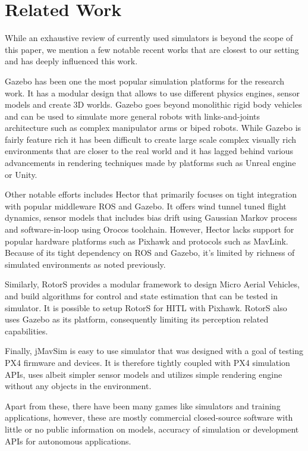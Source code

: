 \documentclass[graybox]{svmult}
\begin{document}
\section{Related Work}
While an exhaustive review of currently used simulators is beyond the scope of this paper, we mention a few notable recent works that are closest to our setting and has deeply influenced this work.

Gazebo \cite{koenig2004design} has been one the most popular simulation platforms for the research work. It has a modular design that allows to use different physics engines, sensor models and create 3D worlds. Gazebo goes beyond monolithic rigid body vehicles and can be used to simulate more general robots with links-and-joints architecture such as complex manipulator arms or biped robots. While Gazebo is fairly feature rich it has been difficult to create large scale complex visually rich environments that are closer to the real world and it has lagged behind various advancements in rendering techniques made by platforms such as Unreal engine or Unity.

Other notable efforts includes Hector \cite{meyer2012comprehensive} that primarily focuses on tight integration with popular middleware ROS and Gazebo. It offers wind tunnel tuned flight dynamics, sensor models that includes bias drift using Gaussian Markov process and software-in-loop using Orocos toolchain. However, Hector lacks support for popular hardware platforms such as Pixhawk and protocols such as MavLink. Because of its tight dependency on ROS and Gazebo, it's limited by richness of simulated environments as noted previously.

Similarly, RotorS \cite{furrer2016rotors} provides a modular framework to design Micro Aerial Vehicles, and build algorithms for control and state estimation that can be tested in simulator. It is possible to setup RotorS for HITL with Pixhawk. RotorS also uses Gazebo as its platform, consequently limiting its perception related capabilities. 

Finally, jMavSim \cite{jmavsim} is easy to use simulator that was designed with a goal of testing PX4 firmware and devices. It is therefore tightly coupled with PX4 simulation APIs, uses albeit simpler sensor models and utilizes simple rendering engine without any objects in the environment. 

Apart from these, there have been many games like simulators and training applications, however, these are mostly commercial closed-source software with little or no public information on models, accuracy of simulation or development APIs for autonomous applications.
\end{document}
